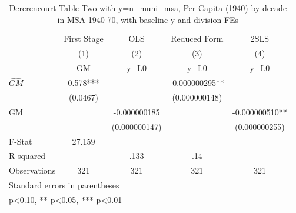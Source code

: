 \begin{table}[htbp]\centering
\def\sym#1{\ifmmode^{#1}\else\(^{#1}\)\fi}
\caption{Dererencourt Table Two with y=n\_muni\_msa, Per Capita (1940) by decade in MSA 1940-70, with baseline y and division FEs}
\begin{tabular}{l*{4}{c}}
\toprule
                    & First Stage   &         OLS   &Reduced Form   &        2SLS   \\
                    &\multicolumn{1}{c}{(1)}&\multicolumn{1}{c}{(2)}&\multicolumn{1}{c}{(3)}&\multicolumn{1}{c}{(4)}\\
                    &\multicolumn{1}{c}{GM}&\multicolumn{1}{c}{y\_L0}&\multicolumn{1}{c}{y\_L0}&\multicolumn{1}{c}{y\_L0}\\
\midrule
$\hat{GM}$          &       0.578***&               &-0.000000295** &               \\
                    &    (0.0467)   &               &(0.000000148)   &               \\
\addlinespace
GM                  &               &-0.000000185   &               &-0.000000510** \\
                    &               &(0.000000147)   &               &(0.000000255)   \\
\midrule
F-Stat              &      27.159   &               &               &               \\
R-squared           &               &        .133   &         .14   &               \\
Observations        &         321   &         321   &         321   &         321   \\
\bottomrule
\multicolumn{5}{l}{\footnotesize Standard errors in parentheses}\\
\multicolumn{5}{l}{\footnotesize * p<0.10, ** p<0.05, *** p<0.01}\\
\end{tabular}
\end{table}
